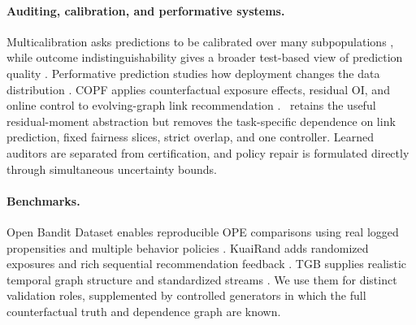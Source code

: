 \paragraph{Auditing, calibration, and performative systems.}
Multicalibration asks predictions to be calibrated over many subpopulations \citep{hebertjohnson2018multicalibration}, while outcome indistinguishability gives a broader test-based view of prediction quality \citep{dwork2021outcome}. Performative prediction studies how deployment changes the data distribution \citep{perdomo2020performative}. COPF applies counterfactual exposure effects, residual OI, and online control to evolving-graph link recommendation \citep{li2026copf}. \COMET\ retains the useful residual-moment abstraction but removes the task-specific dependence on link prediction, fixed fairness slices, strict overlap, and one controller. Learned auditors are separated from certification, and policy repair is formulated directly through simultaneous uncertainty bounds.

\paragraph{Benchmarks.}
Open Bandit Dataset enables reproducible OPE comparisons using real logged propensities and multiple behavior policies \citep{saito2021open}. KuaiRand adds randomized exposures and rich sequential recommendation feedback \citep{gao2022kuairand}. TGB supplies realistic temporal graph structure and standardized streams \citep{huang2023tgb}. We use them for distinct validation roles, supplemented by controlled generators in which the full counterfactual truth and dependence graph are known.
